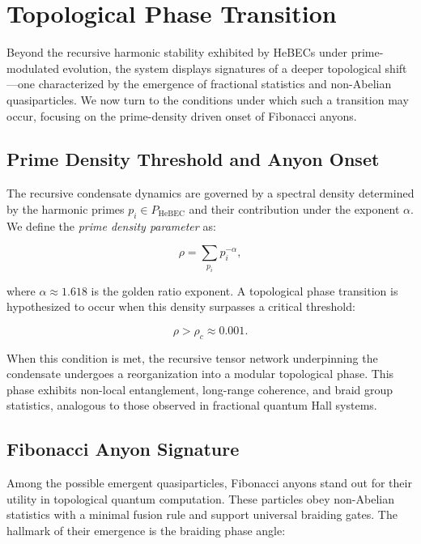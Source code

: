 \documentclass{article}
\theoremstyle{plain}
\begin{document}
\section{Topological Phase Transition}

Beyond the recursive harmonic stability exhibited by HeBECs under prime-modulated evolution, the system displays signatures of a deeper topological shift—one characterized by the emergence of fractional statistics and non-Abelian quasiparticles. We now turn to the conditions under which such a transition may occur, focusing on the prime-density driven onset of Fibonacci anyons.

\subsection{Prime Density Threshold and Anyon Onset}

The recursive condensate dynamics are governed by a spectral density determined by the harmonic primes \( p_i \in P_{\text{HeBEC}} \) and their contribution under the exponent \( \alpha \). We define the \textit{prime density parameter} as:

\begin{equation}
\rho = \sum_{p_i} p_i^{-\alpha},
\end{equation}

where \( \alpha \approx 1.618 \) is the golden ratio exponent. A topological phase transition is hypothesized to occur when this density surpasses a critical threshold:

\begin{equation}
\rho > \rho_c \approx 0.001.
\end{equation}

When this condition is met, the recursive tensor network underpinning the condensate undergoes a reorganization into a modular topological phase. This phase exhibits non-local entanglement, long-range coherence, and braid group statistics, analogous to those observed in fractional quantum Hall systems.

\subsection{Fibonacci Anyon Signature}

Among the possible emergent quasiparticles, Fibonacci anyons stand out for their utility in topological quantum computation. These particles obey non-Abelian statistics with a minimal fusion rule and support universal braiding gates. The hallmark of their emergence is the braiding phase angle:
\end{document}
